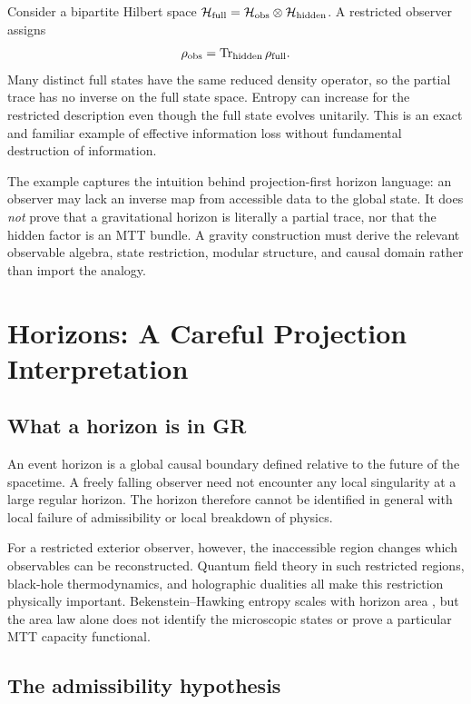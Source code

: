 \documentclass[11pt]{article}
\newcommand{\cH}{\mathcal H}
\begin{document}
Consider a bipartite Hilbert space
\(\cH_{\rm full}=\cH_{\rm obs}\otimes\cH_{\rm hidden}\).  A restricted
observer assigns
\[
 \rho_{\rm obs}
 =\operatorname{Tr}_{\rm hidden}\rho_{\rm full}.
\]
Many distinct full states have the same reduced density operator, so the
partial trace has no inverse on the full state space.  Entropy can increase
for the restricted description even though the full state evolves
unitarily.  This is an exact and familiar example of effective information
loss without fundamental destruction of information.

The example captures the intuition behind projection-first horizon language:
an observer may lack an inverse map from accessible data to the global state.
It does \emph{not} prove that a gravitational horizon is literally a partial
trace, nor that the hidden factor is an MTT bundle.  A gravity construction
must derive the relevant observable algebra, state restriction, modular
structure, and causal domain rather than import the analogy.

\section{Horizons: A Careful Projection Interpretation}

\subsection{What a horizon is in GR}

An event horizon is a global causal boundary defined relative to the future
of the spacetime.  A freely falling observer need not encounter any local
singularity at a large regular horizon.  The horizon therefore cannot be
identified in general with local failure of admissibility or local breakdown
of physics.

For a restricted exterior observer, however, the inaccessible region changes
which observables can be reconstructed.  Quantum field theory in such
restricted regions, black-hole thermodynamics, and holographic dualities all
make this restriction physically important.  Bekenstein--Hawking entropy
scales with horizon area \cite{Bekenstein,Hawking,GibbonsHawking}, but the area
law alone does not identify the microscopic states or prove a particular MTT
capacity functional.

\subsection{The admissibility hypothesis}
\end{document}
